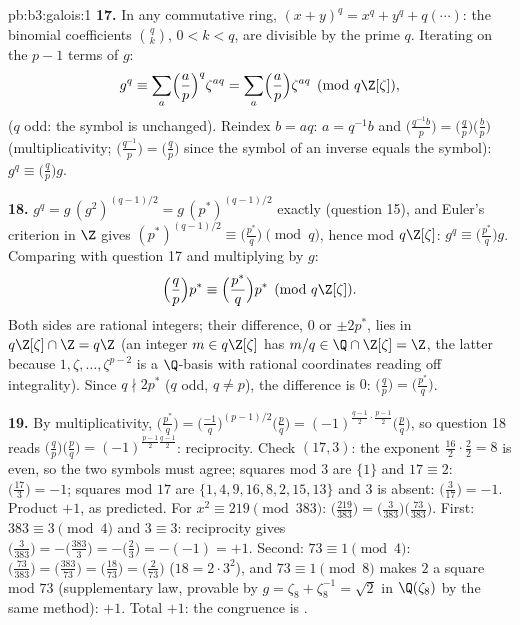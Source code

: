 \begin{solution}{pb:b3:galois:1}
\textbf{17.} In any commutative ring, $(x + y)^q = x^q + y^q
+ q(\cdots)$: the binomial coefficients $\binom qk$, $0 < k <
q$, are divisible by the prime $q$. Iterating on the $p - 1$
terms of $g$:
\[
g^q \equiv \sum_{a}\Bigl(\frac ap\Bigr)^{q}\zeta^{aq}
= \sum_a\Bigl(\frac ap\Bigr)\zeta^{aq}
\pmod{q\Z[\zeta]},
\]
($q$ odd: the symbol is unchanged). Reindex $b = aq$: $a =
q^{-1}b$ and $\bigl(\frac{q^{-1}b}p\bigr) =
\bigl(\frac{q}p\bigr)\bigl(\frac bp\bigr)$ (multiplicativity;
$\bigl(\frac{q^{-1}}p\bigr) = \bigl(\frac qp\bigr)$ since the
symbol of an inverse equals the symbol): $g^q \equiv
\bigl(\frac qp\bigr)g$.

\textbf{18.} $g^q = g\,(g^2)^{(q-1)/2} = g\,(p^*)^{(q-1)/2}$
exactly (question 15), and Euler's criterion in $\Z$ gives
$(p^*)^{(q-1)/2} \equiv \bigl(\frac{p^*}q\bigr) \pmod q$,
hence mod $q\Z[\zeta]$: $g^q \equiv \bigl(\frac{p^*}q\bigr)g$.
Comparing with question 17 and multiplying by $g$:
\[
\Bigl(\frac qp\Bigr)p^* \equiv \Bigl(\frac{p^*}q\Bigr)p^*
\pmod{q\Z[\zeta]} .
\]
Both sides are rational integers; their difference, $0$ or
$\pm2p^*$, lies in $q\Z[\zeta] \cap \Z = q\Z$ (an integer $m
\in q\Z[\zeta]$ has $m/q \in \Q \cap \Z[\zeta] = \Z$, the
latter because $1, \zeta, \dots, \zeta^{p-2}$ is a
$\Q$-basis with rational coordinates reading off
integrality). Since $q \nmid 2p^*$ ($q$ odd, $q \neq p$),
the difference is $0$: $\bigl(\frac qp\bigr) =
\bigl(\frac{p^*}q\bigr)$.

\textbf{19.} By multiplicativity, $\bigl(\frac{p^*}q\bigr) =
\bigl(\frac{-1}q\bigr)^{(p-1)/2}\bigl(\frac pq\bigr) =
(-1)^{\frac{q-1}2\cdot\frac{p-1}2}\bigl(\frac pq\bigr)$,
so question 18 reads $\bigl(\frac qp\bigr)\bigl(\frac
pq\bigr) = (-1)^{\frac{p-1}2\frac{q-1}2}$: reciprocity.
Check $(17, 3)$: the exponent $\frac{16}2\cdot\frac22 = 8$
is even, so the two symbols must agree; squares mod $3$ are $\{1\}$ and $17 \equiv 2$: 
$\bigl(\frac{17}3\bigr) = -1$; squares mod $17$ are $\{1, 4,
9, 16, 8, 2, 15, 13\}$ and $3$ is absent:
$\bigl(\frac3{17}\bigr) = -1$. Product $+1$, as predicted. For $x^2
\equiv 219 \pmod{383}$: $\bigl(\frac{219}{383}\bigr) =
\bigl(\frac3{383}\bigr)\bigl(\frac{73}{383}\bigr)$. First:
$383 \equiv 3 \pmod4$ and $3 \equiv 3$: reciprocity gives
$\bigl(\frac3{383}\bigr) = -\bigl(\frac{383}3\bigr) =
-\bigl(\frac23\bigr) = -(-1) = +1$. Second: $73 \equiv 1
\pmod 4$: $\bigl(\frac{73}{383}\bigr) =
\bigl(\frac{383}{73}\bigr) = \bigl(\frac{18}{73}\bigr) =
\bigl(\frac2{73}\bigr)$ ($18 = 2\cdot3^2$), and $73 \equiv 1
\pmod 8$ makes $2$ a square mod $73$ (supplementary law,
provable by $g = \zeta_8 + \zeta_8^{-1} = \sqrt2$ in
$\Q(\zeta_8)$ by the same method): $+1$. Total $+1$: the
congruence is .


\end{solution}
